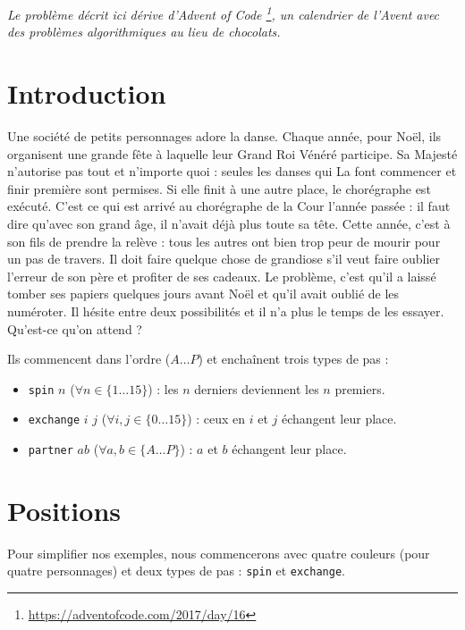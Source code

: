 \documentclass[11pt,a4paper,oneside]{article}
\begin{document}
\emph{Le problème décrit ici dérive d'Advent of Code
\footnote{\url{https://adventofcode.com/2017/day/16}},
un calendrier de l'Avent avec
des problèmes algorithmiques au lieu de chocolats.}

\section{Introduction}
Une société de petits personnages adore la danse. Chaque année, pour Noël, ils
organisent une grande fête à laquelle leur Grand Roi Vénéré participe. Sa
Majesté n'autorise pas tout et n'importe quoi : seules les danses qui La font
commencer et finir première sont permises. Si elle finit à une autre place, le
chorégraphe est exécuté. C'est ce qui est arrivé au chorégraphe de la Cour
l'année passée : il faut dire qu'avec son grand âge, il n'avait déjà plus toute
sa tête. Cette année, c'est à son fils de prendre la relève : tous les autres
ont bien trop peur de mourir pour un pas de travers. Il doit faire quelque
chose de grandiose s'il veut faire oublier l'erreur de son père et profiter de
ses cadeaux. Le problème, c'est qu'il a laissé tomber ses papiers quelques
jours avant Noël et qu'il avait oublié de les numéroter. Il hésite entre deux
possibilités et il n'a plus le temps de les essayer. Qu'est-ce qu'on attend ?

Ils commencent dans l'ordre ($A\dots P$) et enchaînent trois types de pas :
\begin{itemize}
\item \texttt{spin} $n$ ($\forall n \in \{1\dots15\}$) :
	les $n$ derniers deviennent les $n$ premiers.
\item \texttt{exchange} $i$ $j$ ($\forall i,j \in \{0\dots15\}$) :
	ceux en $i$ et $j$ échangent leur place.
\item \texttt{partner} $ab$ ($\forall a,b \in \{A\dots P\}$) :
	$a$ et $b$ échangent leur place.
\end{itemize}

\section{Positions}
Pour simplifier nos exemples, nous commencerons avec quatre couleurs (pour
quatre personnages) et deux types de pas : \texttt{spin} et \texttt{exchange}.
\end{document}
